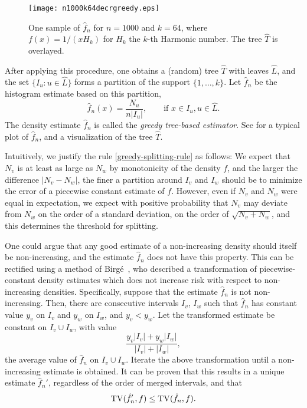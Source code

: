 \begin{figure}
  \centering
  \texttt{[image: n1000k64decrgreedy.eps]}
  \caption{One sample of $\hat{f}_n$ for $n = 1000$ and $k = 64$,
    where $f(x) = 1/(x H_k)$ for $H_k$ the $k$-th Harmonic number. The
    tree $\widehat{T}$ is overlayed.}
\end{figure}
After applying this procedure, one obtains a (random) tree
$\widehat{T}$ with leaves $\widehat{L}$, and the set
$\{I_u \colon u \in \widehat{L}\}$ forms a partition of the support
$\{1, \dots, k\}$. Let $\hat{f}_n$ be the histogram estimate based on
this partition, \ie
\[
  \hat{f}_n(x) = \frac{N_u}{n |I_u|} , \qquad \text{if $x \in I_u, u \in \widehat{L}$.}
\]
The density estimate $\hat{f}_n$ is called the \emph{greedy tree-based
  estimator}. See  for a typical plot of $\hat{f}_n$,
and a visualization of the tree $\widehat{T}$.

\begin{rem}
Intuitively, we justify the rule \eqref{greedy-splitting-rule} as
follows: We expect that $N_v$ is at least as large as $N_w$ by
monotonicity of the density $f$, and the larger the difference
$|N_v - N_w|$, the finer a partition around $I_v$ and $I_w$ should be
to minimize the error of a piecewise constant estimate of
$f$. However, even if $N_v$ and $N_w$ were equal in expectation, we
expect with positive probability that $N_v$ may deviate from $N_w$ on
the order of a standard deviation, \ie on the order of
$\sqrt{N_v + N_w}$, and this determines the threshold for splitting.
\end{rem}

\begin{rem}
  One could argue that any good estimate of a non-increasing density
  should itself be non-increasing, and the estimate $\hat{f}_n$ does
  not have this property. This can be rectified using a method of
  Birg\'{e}~\cite{birge-risk}, who described a transformation of
  piecewise-constant density estimates which does not increase risk
  with respect to non-increasing densities. Specifically, suppose that
  the estimate $\hat{f}_n$ is not non-increasing. Then, there are
  consecutive intervals $I_v$, $I_w$ such that $\hat{f}_n$ has
  constant value $y_v$ on $I_v$ and $y_w$ on $I_w$, and $y_v <
  y_w$. Let the transformed estimate be constant on $I_v \cup I_w$,
  with value
  \[
    \frac{y_v |I_v| + y_w |I_w|}{|I_v| + |I_w|} ,
  \]
  \ie the average value of $\hat{f}_n$ on $I_v \cup I_w$. Iterate the
  above transformation until a non-increasing estimate is obtained. It
  can be proven that this results in a unique estimate $\hat{f}_n'$,
  regardless of the order of merged intervals, and that
  \[
    \operatorname{TV}(\hat{f}_n', f) \le \operatorname{TV}(\hat{f}_n, f) .
  \]
\end{rem}

